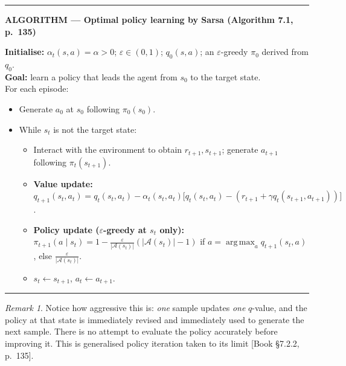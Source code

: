 \documentclass[11pt, letterpaper]{article}
\theoremstyle{runin}
\theoremstyle{runinplain}
\theoremstyle{remark}
\newtheorem*{remark}{Remark}
\newcommand{\Aspace}{\mathcal{A}}
\newcommand{\argmax}{\operatorname*{arg\,max}}
\newcommand{\bkin}[1]{{\color{bookblue}\small[\textsf{Book #1}]}}
\newenvironment{algobox}[1]
  {\par\medskip\noindent\rule{\textwidth}{0.9pt}\par\nobreak\vspace{0.25em}
   \noindent\textbf{\small ALGORITHM --- #1}\par\nobreak\vspace{0.15em}
   \small}
  {\par\nobreak\vspace{0.25em}\noindent\rule{\textwidth}{0.9pt}\par\medskip}
\begin{document}
\begin{algobox}{Optimal policy learning by Sarsa (Algorithm 7.1, p.~135)}
\textbf{Initialise:} $\alpha_t(s,a)=\alpha>0$; $\varepsilon\in(0,1)$;
$q_0(s,a)$; an $\varepsilon$-greedy $\pi_0$ derived from $q_0$.\\
\textbf{Goal:} learn a policy that leads the agent from $s_0$ to the target state.\\
For each episode:
\begin{itemize}\itemsep0pt
  \item Generate $a_0$ at $s_0$ following $\pi_0(s_0)$.
  \item While $s_t$ is not the target state:
    \begin{itemize}\itemsep0pt
      \item Interact with the environment to obtain $r_{t+1},s_{t+1}$; generate
            $a_{t+1}$ following $\pi_t(s_{t+1})$.
      \item \textbf{Value update:}
            $q_{t+1}(s_t,a_t)=q_t(s_t,a_t)-\alpha_t(s_t,a_t)\bigl[q_t(s_t,a_t)-(r_{t+1}+\gamma q_t(s_{t+1},a_{t+1}))\bigr]$.
      \item \textbf{Policy update ($\varepsilon$-greedy at $s_t$ only):}
            $\pi_{t+1}(a\mid s_t)=1-\frac{\varepsilon}{|\Aspace(s_t)|}(|\Aspace(s_t)|-1)$
            if $a=\argmax_a q_{t+1}(s_t,a)$, else $\frac{\varepsilon}{|\Aspace(s_t)|}$.
      \item $s_t\leftarrow s_{t+1}$, $a_t\leftarrow a_{t+1}$.
    \end{itemize}
\end{itemize}
\end{algobox}

\begin{remark}
Notice how aggressive this is: \emph{one} sample updates \emph{one} $q$-value, and
the policy at that state is immediately revised and immediately used to generate the
next sample. There is no attempt to evaluate the policy accurately before improving
it. This is generalised policy iteration taken to its limit
\bkin{\S7.2.2, p.~135}.
\end{remark}
\end{document}

